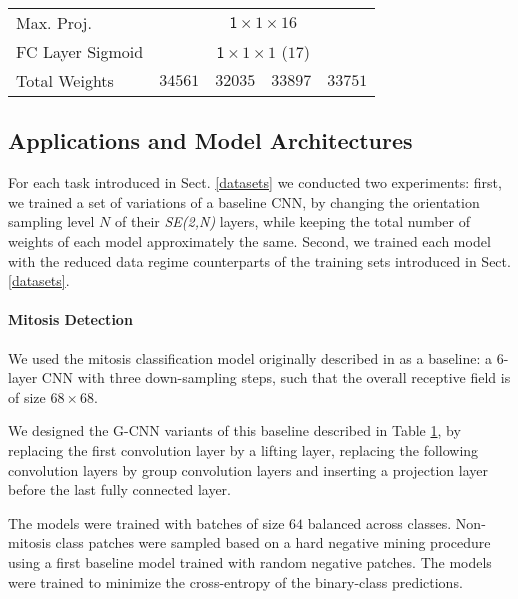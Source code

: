\documentclass[twocolumn,final]{article}
\newcommand{\se}[1]{\textit{SE(#1)}}
\newcommand{\cellFormat}{\scriptsize \fontsize{7pt}{0pt}}
\newcommand{\shortTimes}{\! {\times} \!}
\newlength{\cellWidth}   \setlength{\cellWidth}{0.14\columnwidth}
\begin{document}
\begin{table}[ht!]
\begin{tabular}{p{} || p{\cellWidth}  p{\cellWidth} p{\cellWidth} p{\cellWidth}}
\scriptsize \centering Max. Proj.
& \multicolumn{4}{c}{ \cellFormat $\mathsf 1 \shortTimes 1 \shortTimes 16$ }
\\

\scriptsize \centering FC Layer \newline Sigmoid 
& \multicolumn{4}{c}{ \cellFormat $\mathsf 1 \shortTimes 1 \shortTimes 1$ ($17$) }
\\\hline

\scriptsize \centering Total \newline Weights
& \multicolumn{1}{c}{ \scriptsize $34561$}
& \multicolumn{1}{c}{ \scriptsize $32035$ }
& \multicolumn{1}{c}{ \scriptsize $33897$ }
& \multicolumn{1}{c}{ \scriptsize $33751$ }

\end{tabular}
\label{tab:mitosisArchitecture} 
\end{table}


\subsection{Applications and Model Architectures}
\label{sec:expApplicationsAndTraining}
For each task introduced in Sect. \ref{datasets} we conducted two experiments:
first, we trained a set of variations of a baseline CNN, by changing the orientation sampling level $N$ of their \se{2,N} layers, while keeping the total number of weights of each model approximately the same.
Second, we trained each model with the reduced data regime counterparts of the training sets introduced in Sect. \ref{datasets}.


\paragraph{Mitosis Detection}
We used the mitosis classification model originally described in \cite{bekkers2018roto} as a baseline: a 6-layer CNN with three down-sampling steps, such that the overall receptive field is of size $68 \times 68$.

We designed the G-CNN variants of this baseline described in Table \ref{tab:mitosisArchitecture}, by replacing the first convolution layer by a lifting layer, replacing the following convolution layers by group convolution layers and inserting a projection layer before the last fully connected layer.

The models were trained with batches of size $64$ balanced across classes. Non-mitosis class patches were sampled based on a hard negative mining procedure \citep{cirecsan2013mitosis} using a first baseline model trained with random negative patches.
The models were trained to minimize the cross-entropy of the binary-class predictions.
\end{document}

